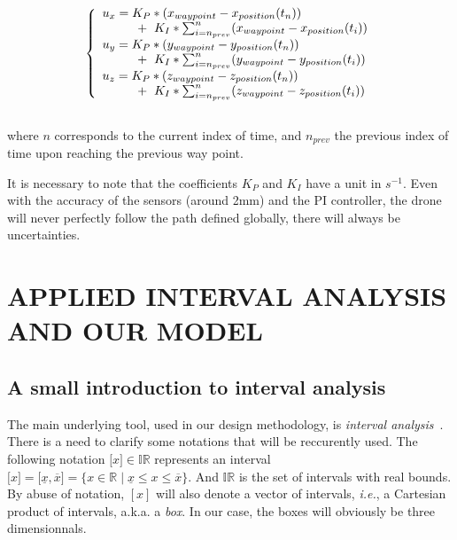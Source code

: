 \documentclass[letterpaper, 10 pt, conference]{ieeeconf}  %
\newcommand{\Rset}{\mathbb{R}}
\begin{document}
\begin{equation}
    \left\{
    \begin{array}{ll}
        u_{x} = K_{P} * ( x_{waypoint} - x_{position}(t_{n}) )\\
    \hspace{1cm} + \hspace{0.2cm} K_{I} * \sum_{i=n_{prev}}^{n}( x_{waypoint} - x_{position}(t_{i}))\\
        u_{y} = K_{P} * ( y_{waypoint} - y_{position}(t_{n}) )\\
    \hspace{1cm} + \hspace{0.2cm} K_{I} * \sum_{i=n_{prev}}^{n}( y_{waypoint} - y_{position}(t_{i}))\\
    u_{z} = K_{P} * ( z_{waypoint} - z_{position}(t_{n}) )\\
    \hspace{1cm} + \hspace{0.2cm} K_{I} * \sum_{i=n_{prev}}^{n}( z_{waypoint} - z_{position}(t_{i}))\\
    \end{array}
    \right.
\end{equation}\\
where $n$ corresponds to the current index of time, and $n_{prev}$ the previous index of time upon reaching the previous way point.


It is necessary to note that the coefficients $K_{P}$ and $K_{I}$ have a unit in $s^{-1}$. Even with the accuracy of the sensors (around 2mm) and the PI controller, the drone will never perfectly follow the path defined globally, there will always be uncertainties. 


\section{APPLIED INTERVAL ANALYSIS AND OUR MODEL}

\subsection{A small introduction to interval analysis}

The main underlying tool, used in our design methodology, is
\emph{interval analysis}~\cite{Moore66}. 
There is a need to clarify some notations that will be reccurently used. The following notation $\lbrack x \rbrack \in \mathbb{IR}$ represents an interval $\lbrack x \rbrack =
\lbrack\underline{x}, \overline{x}\rbrack=\{ x \in \Rset \mid
\underline{x} \leqslant x \leqslant \overline{x} \}$. And $\mathbb{IR}$ is the set of
intervals with real bounds. By abuse of notation, $[x]$ will also denote a vector of
intervals, \emph{i.e.}, a Cartesian product of intervals, a.k.a. a
\emph{box}. In our case, the boxes will obviously be three dimensionnals.\\
\end{document}
